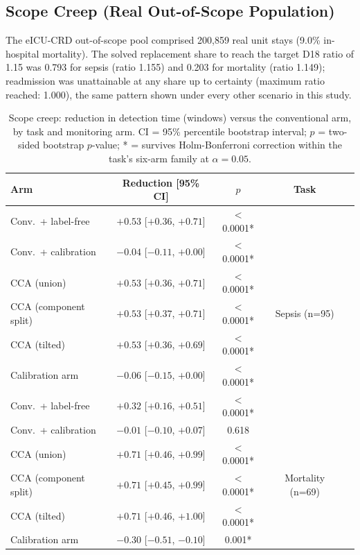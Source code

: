 \documentclass[apajournal,article,submit,oneauthor]{Definitions/mdpi}
\begin{document}
\subsection{Scope Creep (Real Out-of-Scope Population)}\label{sec:results-scopecreep}

The eICU-CRD out-of-scope pool comprised 200{,}859 real unit stays (9.0\% in-hospital mortality). The solved replacement share to reach the target D18 ratio of 1.15 was 0.793 for sepsis (ratio 1.155) and 0.203 for mortality (ratio 1.149); readmission was unattainable at any share up to certainty (maximum ratio reached: 1.000), the same pattern shown under every other scenario in this study.

\begin{table}[H]
\caption{Scope creep: reduction in detection time (windows) versus the conventional arm, by task and monitoring arm. CI = 95\% percentile bootstrap interval; $p$ = two-sided bootstrap $p$-value; * = survives Holm-Bonferroni correction within the task's six-arm family at $\alpha=0.05$.\label{tab:scopecreep}}
\begin{tabularx}{\textwidth}{lCCCC}
\toprule
\textbf{Arm} & \textbf{Reduction [95\% CI]} & \textbf{$p$} & \textbf{Task} & \\
\midrule
Conv.\ + label-free    & $+0.53$ [$+0.36$, $+0.71$]  & $<$0.0001* &   & \\
Conv.\ + calibration   & $-0.04$ [$-0.11$, $+0.00$]  & $<$0.0001* &  & \\
CCA (union)            & $+0.53$ [$+0.36$, $+0.71$]  & $<$0.0001* &  & \\
CCA (component split)  & $+0.53$ [$+0.37$, $+0.71$]  & $<$0.0001* & Sepsis (n=95) & \\
CCA (tilted)            & $+0.53$ [$+0.36$, $+0.69$]  & $<$0.0001* &  & \\
Calibration arm        & $-0.06$ [$-0.15$, $+0.00$]  & $<$0.0001* &  & \\
\midrule
Conv.\ + label-free    & $+0.32$ [$+0.16$, $+0.51$]  & $<$0.0001* &   & \\
Conv.\ + calibration   & $-0.01$ [$-0.10$, $+0.07$]  & 0.618 &  & \\
CCA (union)            & $+0.71$ [$+0.46$, $+0.99$]  & $<$0.0001* &  & \\
CCA (component split)  & $+0.71$ [$+0.45$, $+0.99$]  & $<$0.0001* & Mortality (n=69) & \\
CCA (tilted)            & $+0.71$ [$+0.46$, $+1.00$]  & $<$0.0001* &  & \\
Calibration arm        & $-0.30$ [$-0.51$, $-0.10$]  & 0.001* &  & \\
\bottomrule
\end{tabularx}
\end{table}
\end{document}
